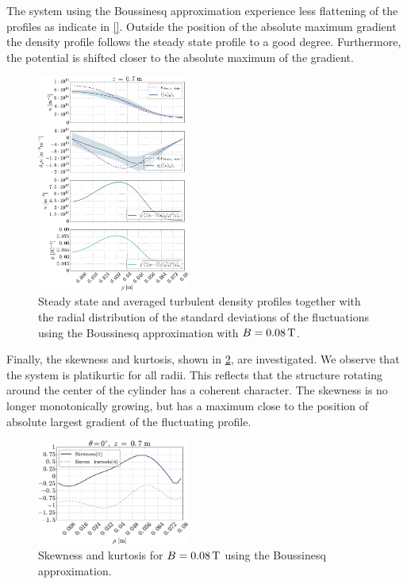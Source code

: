 The system using the Boussinesq approximation experience less flattening of the profiles as indicate in \cref{}.
Outside the position of the absolute maximum gradient the density profile follows the steady state profile to a good degree.
Furthermore, the potential is shifted closer to the absolute maximum of the gradient.
%
\begin{figure}[htb]
    \centering
    \includegraphics[width=0.45\textwidth]{fig/results/compareBouss/fluctProfiles008B}
    \caption{Steady state and averaged turbulent density profiles together with the radial distribution of the standard deviations of the fluctuations using the Boussinesq approximation with $B=0.08\, \text{T}$.}
    \label{fig:posOfFluct008B}
\end{figure}
%
Finally, the skewness and kurtosis, shown in \cref{fig:skewKurt008B}, are investigated.
We observe that the system is platikurtic for all radii.
This reflects that the structure rotating around the center of the cylinder has a coherent character.
The skewness is no longer monotonically growing, but has a maximum close to the position of absolute largest gradient of the fluctuating profile.
%
\begin{figure}[htb]
    \centering
    \includegraphics[width=0.45\textwidth]{fig/results/compareBouss/skewKurt008B}
    \caption{Skewness and kurtosis for $B=0.08\, \text{T}$ using the Boussinesq approximation.}
    \label{fig:skewKurt008B}
\end{figure}
%

